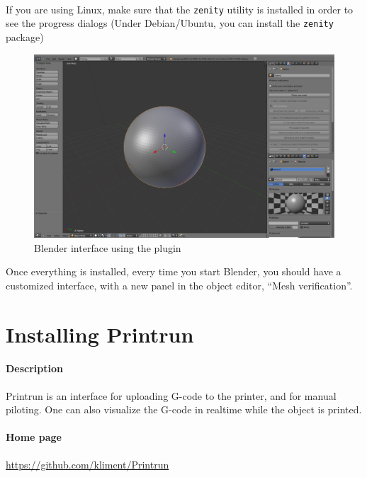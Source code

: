 \documentclass{article}
\begin{document}
	
	\paragraph{} If you are using Linux, make sure that the \texttt{zenity} utility is installed in order to see the progress dialogs (Under Debian/Ubuntu, you can install the \texttt{zenity} package)

	\begin{figure}[h!]
		\centering
		\includegraphics[width=\linewidth]{blender-plugin.png}
		\caption{Blender interface using the plugin}
	\end{figure}

	Once everything is installed, every time you start Blender, you should have a customized interface, with a new panel in the object editor, “Mesh verification”.

\newpage

\section{Installing Printrun}

	\paragraph{Description} Printrun is an interface for uploading G-code to the printer, and for manual piloting. One can also visualize the G-code in realtime while the object is printed.

	\paragraph{Home page} \url{https://github.com/kliment/Printrun}
\end{document}
